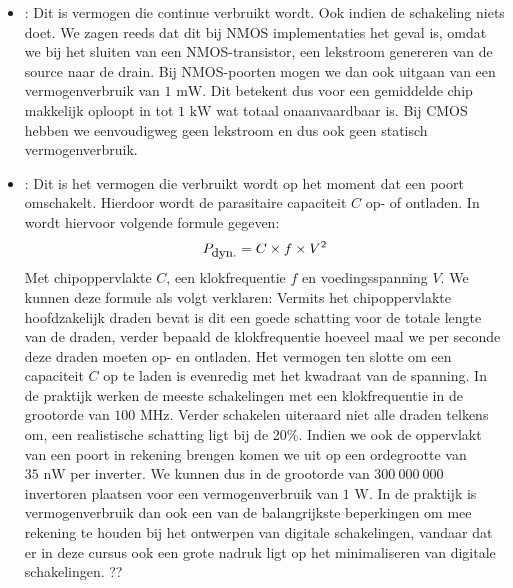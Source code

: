 \begin{itemize}
 \item {}: Dit is vermogen die continue verbruikt wordt. Ook indien de schakeling niets doet. We zagen reeds dat dit bij NMOS implementaties het geval is, omdat we bij het sluiten van een NMOS-transistor, een lekstroom genereren van de source naar de drain. Bij NMOS-poorten mogen we dan ook uitgaan van een vermogenverbruik van $1\mbox{ mW}$. Dit betekent dus voor een gemiddelde chip makkelijk oploopt in tot $1\mbox{ kW}$ wat totaal onaanvaardbaar is. Bij CMOS hebben we eenvoudigweg geen lekstroom en dus ook geen statisch vermogenverbruik.
 \item {}: Dit is het vermogen die verbruikt wordt op het moment dat een poort omschakelt. Hierdoor wordt de parasitaire capaciteit $C$ op- of ontladen. In \cite[3.12]{brown2004fundamentals} wordt hiervoor volgende formule gegeven:
\begin{equation}
P_{\mbox{\small{dyn.}}}=C\times f\times V^2
\end{equation}
Met chipoppervlakte $C$, een klokfrequentie $f$ en voedingsspanning $V$. We kunnen deze formule als volgt verklaren: Vermits het chipoppervlakte hoofdzakelijk draden bevat is dit een goede schatting voor de totale lengte van de draden, verder bepaald de klokfrequentie hoeveel maal we per seconde deze draden moeten op- en ontladen. Het vermogen ten slotte om een capaciteit $C$ op te laden is evenredig met het kwadraat van de spanning. In de praktijk werken de meeste schakelingen met een klokfrequentie in de grootorde van $100\mbox{ MHz}$. Verder schakelen uiteraard niet alle draden telkens om, een realistische schatting ligt bij de 20\%. Indien we ook de oppervlakt van een poort in rekening brengen komen we uit op een ordegrootte van $35\mbox{ nW}$ per inverter. We kunnen dus in de grootorde van $300\ 000\ 000$ invertoren plaatsen voor een vermogenverbruik van $1\mbox{ W}$. In de praktijk is vermogenverbruik dan ook een van de balangrijkste beperkingen om mee rekening te houden bij het ontwerpen van digitale schakelingen, vandaar dat er in deze cursus ook een grote nadruk ligt op het minimaliseren van digitale schakelingen.
??%
\end{itemize}

